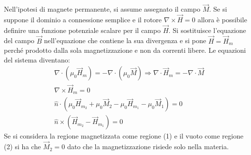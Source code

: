Nell'ipotesi di magnete permanente, si assume assegnato il campo $\vec{M}$. Se si suppone il 
dominio a connessione semplice e il rotore $\nabla\times\vec{H}=0$ allora è possibile
definire una funzione potenziale scalare per il campo $\vec{H}$. Si sostituisce
l'equazione del campo $\vec{B}$ nell'equazione che contiene la sua divergenza e si pone
$\vec{H}= \vec{H}_m$ perché prodotto dalla sola magnetizzazione e non da correnti libere.
Le equazioni del sistema diventano:
$$
\begin{aligned}
&\nabla\cdot\left(\mu_0\vec{H}_m\right) = - \nabla\cdot\left(\mu_0\vec{M}\right)
\Rightarrow \nabla\cdot\vec{H}_m = -\nabla\cdot\vec{M}\\
&\nabla\times\vec{H}_m=0\\
&\hat{n}\cdot\left(\mu_0\vec{H}_{m_2} + \mu_0\vec{M}_2 - \mu_0\vec{H}_{m_1}-\mu_0\vec{M}_1\right) = 0\\
&\hat{n}\times\left(\vec{H}_{m_2}-\vec{H}_{m_1}\right) = 0
\end{aligned}
$$
Se si considera la regione magnetizzata come regione (1) e il vuoto come regione (2)
si ha che $\vec{M}_2 = 0$ dato che la magnetizzazione risiede solo nella materia.

